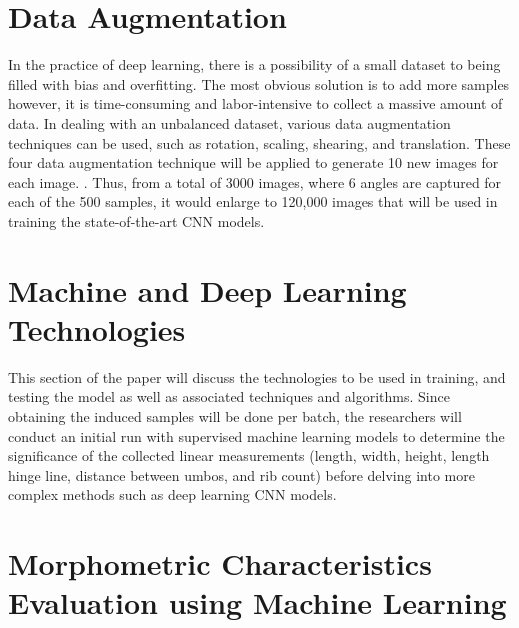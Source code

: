 \section{Data Augmentation}
In the practice of deep learning, there is a possibility of a small dataset to being filled with bias and overfitting. The most obvious solution is to add more samples however, it is time-consuming and labor-intensive to collect a massive amount of data. In dealing with an unbalanced dataset, various data augmentation techniques can be used, such as rotation, scaling, shearing, and translation. These four data augmentation technique will be applied to generate 10 new images for each image. \cite{cui2020}. Thus, from a total of 3000 images, where 6 angles are captured for each of the 500 samples, it would enlarge to 120,000 images that will be used in training the state-of-the-art CNN models. 

\section{Machine and Deep Learning Technologies}

This section of the paper will discuss the technologies to be used in training, and testing the model as well as associated techniques and algorithms. Since obtaining the induced samples will be done per batch, the researchers will conduct an initial run with supervised machine learning models to determine the significance of the collected linear measurements (length, width, height, length hinge line, distance between umbos, and rib count) before delving into more complex methods such as deep learning CNN models. 

\section{Morphometric Characteristics Evaluation using Machine Learning }
\label{sec:ml models}

